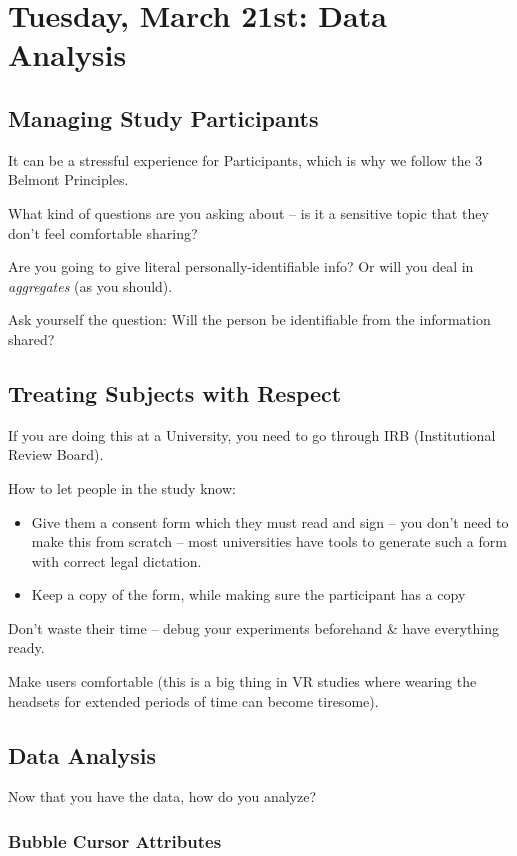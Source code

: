 \section{Tuesday, March 21st: Data Analysis}
\subsection{Managing Study Participants}
It can be a stressful experience for Participants, which is why we follow the 3 Belmont Principles.

What kind of questions are you asking about -- is it a sensitive topic that they don't feel comfortable sharing?

Are you going to give literal personally-identifiable info? Or will you deal in \textit{aggregates} (as you should).

\begin{shaded}
Ask yourself the question: Will the person be identifiable from the information shared?
\end{shaded}

\subsection{Treating Subjects with Respect}
If you are doing this at a University, you need to go through IRB (Institutional Review Board).

How to let people in the study know:
\begin{itemize}
    \item Give them a consent form which they must read and sign -- you don't need to make this from scratch -- most universities have tools to generate such a form with correct legal dictation.
    \item Keep a copy of the form, while making sure the participant has a copy
\end{itemize}

Don't waste their time -- debug your experiments beforehand \& have everything ready.

Make users comfortable (this is a big thing in VR studies where wearing the headsets for extended periods of time can become tiresome).

\subsection{Data Analysis}
Now that you have the data, how do you analyze?

\subsubsection{Bubble Cursor Attributes}
